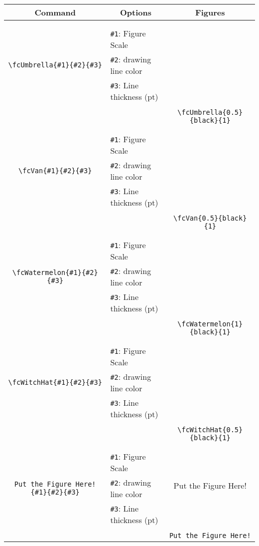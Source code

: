 \documentclass[x11names]{article}
\begin{document}
\begin{table}[H]\centering\begin{tabular}{|c|l|c|}\hline {\bf Command}& \multicolumn{1}{c|}{{\bf Options}} & {\bf Figures}\\  \hline	&&\multirow{5}{*}{\fcUmbrella{0.5}{black}{1}}\\	&&\\	&\verb|#1|: Figure Scale &\\	\verb|\fcUmbrella{#1}{#2}{#3}|&	\verb|#2|: drawing line color &\\	&\verb|#3|: Line thickness (pt) &\\ &&\\&&	\verb|\fcUmbrella{0.5}{black}{1}|\\\hline 	
	&&\multirow{5}{*}{\fcVan{0.5}{black}{1}}\\	&&\\	&\verb|#1|: Figure Scale &\\	\verb|\fcVan{#1}{#2}{#3}|&	\verb|#2|: drawing line color &\\	&\verb|#3|: Line thickness (pt) &\\ &&\\&&	\verb|\fcVan{0.5}{black}{1}|\\\hline 	
	&&\multirow{5}{*}{\fcWatermelon{1}{black}{1}}\\	&&\\	&\verb|#1|: Figure Scale &\\	\verb|\fcWatermelon{#1}{#2}{#3}|&	\verb|#2|: drawing line color &\\	&\verb|#3|: Line thickness (pt) &\\ &&\\&&	\verb|\fcWatermelon{1}{black}{1}|\\\hline 	
	&&\multirow{5}{*}{\fcWitchHat{0.5}{black}{1}}\\	&&\\	&\verb|#1|: Figure Scale &\\	\verb|\fcWitchHat{#1}{#2}{#3}|&	\verb|#2|: drawing line color &\\	&\verb|#3|: Line thickness (pt) &\\ &&\\&&	\verb|\fcWitchHat{0.5}{black}{1}|\\\hline 	
	&&\multirow{5}{*}{Put the Figure Here!}\\	&&\\	&\verb|#1|: Figure Scale &\\	\verb|Put the Figure Here!{#1}{#2}{#3}|&	\verb|#2|: drawing line color &\\	&\verb|#3|: Line thickness (pt) &\\ &&\\&&	\verb|Put the Figure Here!|\\\hline 	

\end{tabular}
\end{table}
\end{document}
